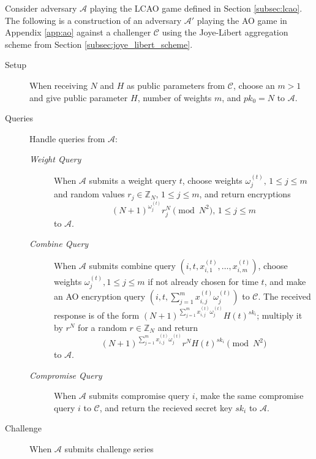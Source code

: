 \documentclass[twocolumn]{autart}
\begin{document}
\begin{pf}
    Consider adversary $\mathcal{A}$ playing the LCAO game defined in Section \ref{subsec:lcao}. The following is a construction of an adversary $\mathcal{A}'$ playing the AO game in Appendix \ref{app:ao} against a challenger $\mathcal{C}$ using the Joye-Libert aggregation scheme from Section \ref{subsec:joye_libert_scheme}.
    \begin{description}
        \item[Setup] When receiving $N$ and $H$ as public parameters from $\mathcal{C}$, choose an $m>1$ and give public parameter $H$, number of weights $m$, and $pk_0=N$ to $\mathcal{A}$.
        \item[Queries] Handle queries from $\mathcal{A}$:
        \begin{description}
            \item[\textit{Weight Query}] When $\mathcal{A}$ submits a weight query $t$, choose weights $\omega^{(t)}_j,\,1 \leq j \leq m$ and random values $r_j \in \mathbb{Z}_N,\,1 \leq j \leq m$, and return encryptions 
            \begin{equation*}
                (N+1)^{\omega^{(t)}_{j}}r_j^N\pmod{N^2},\,1\leq j\leq m
            \end{equation*}
            to $\mathcal{A}$.
            \item[\textit{Combine Query}] When $\mathcal{A}$ submits combine query $(i, t, x^{(t)}_{i,1},\dots,x^{(t)}_{i,m})$, choose weights $\omega^{(t)}_j,1 \leq j \leq m$ if not already chosen for time $t$, and make an AO encryption query $(i, t, \sum^m_{j=1}x^{(t)}_{i,j}\omega^{(t)}_j)$ to $\mathcal{C}$. The received response is of the form $(N+1)^{\sum^m_{j=1}x^{(t)}_{i,j}\omega^{(t)}_j}H(t)^{sk_i}$; multiply it by $r^N$ for a random $r \in \mathbb{Z}_N$ and return 
            \begin{equation*}
                (N+1)^{\sum^m_{j=1}x^{(t)}_{i,j}\omega^{(t)}_j}r^N H(t)^{sk_i} \pmod{N^2}
            \end{equation*}
            to $\mathcal{A}$.
            \item[\textit{Compromise Query}] When $\mathcal{A}$ submits compromise query $i$, make the same compromise query $i$ to $\mathcal{C}$, and return the recieved secret key $sk_i$ to $\mathcal{A}$.
        \end{description}
        \item[Challenge] When $\mathcal{A}$ submits challenge series
        \begin{equation*}

\end{equation*}
\end{description}
\end{pf}
\end{document}
